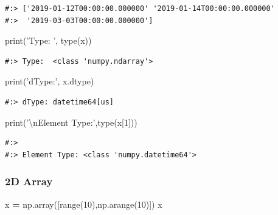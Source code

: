 \documentclass[
]{book}
\newenvironment{Shaded}{\begin{snugshade}}{\end{snugshade}}
\newcommand{\BuiltInTok}[1]{#1}
\newcommand{\CharTok}[1]{\textcolor[rgb]{0.5,0.5,0.5}{#1}}
\newcommand{\DecValTok}[1]{\textcolor[rgb]{0.06,0.06,0.06}{#1}}
\newcommand{\NormalTok}[1]{#1}
\newcommand{\OperatorTok}[1]{\textcolor[rgb]{0.43,0.43,0.43}{\textbf{#1}}}
\newcommand{\StringTok}[1]{\textcolor[rgb]{0.5,0.5,0.5}{#1}}
\begin{document}
\begin{verbatim}
#:> ['2019-01-12T00:00:00.000000' '2019-01-14T00:00:00.000000'
#:>  '2019-03-03T00:00:00.000000']
\end{verbatim}

\begin{Shaded}
\begin{Highlighting}[]
\BuiltInTok{print}\NormalTok{(}\StringTok{'Type: '}\NormalTok{, }\BuiltInTok{type}\NormalTok{(x))}
\end{Highlighting}
\end{Shaded}

\begin{verbatim}
#:> Type:  <class 'numpy.ndarray'>
\end{verbatim}

\begin{Shaded}
\begin{Highlighting}[]
\BuiltInTok{print}\NormalTok{(}\StringTok{'dType:'}\NormalTok{, x.dtype)}
\end{Highlighting}
\end{Shaded}

\begin{verbatim}
#:> dType: datetime64[us]
\end{verbatim}

\begin{Shaded}
\begin{Highlighting}[]
\BuiltInTok{print}\NormalTok{(}\StringTok{'}\CharTok{\textbackslash{}n}\StringTok{Element Type:'}\NormalTok{,}\BuiltInTok{type}\NormalTok{(x[}\DecValTok{1}\NormalTok{]))}
\end{Highlighting}
\end{Shaded}

\begin{verbatim}
#:> 
#:> Element Type: <class 'numpy.datetime64'>
\end{verbatim}

\hypertarget{d-array}{%
\subsubsection{2D Array}\label{d-array}}

\begin{Shaded}
\begin{Highlighting}[]
\NormalTok{x }\OperatorTok{=}\NormalTok{ np.array([}\BuiltInTok{range}\NormalTok{(}\DecValTok{10}\NormalTok{),np.arange(}\DecValTok{10}\NormalTok{)])}
\NormalTok{x}
\end{Highlighting}
\end{Shaded}
\end{document}
